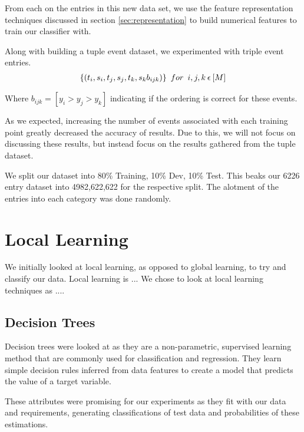 \documentclass[bsc,frontabs,twoside,singlespacing,parskip,deptreport]{infthesis}     %
\begin{document}
    From each on the entries in this new data set, we use the feature representation techniques discussed in section \ref{sec:representation} to build numerical
    features to train our classifier with.

Along with building a tuple event dataset, we experimented with triple event entries.
\begin{eqnarray}
      \{(t_{i},s_{i},t_{j},s_{j},t_{k},s_{k}b_{ijk})\} \hspace{0.5em} for \hspace{0.5em} i,j,k \hspace{0.2em}\epsilon \hspace{0.2em}[M]\nonumber
\end{eqnarray}

Where $b_{ijk} = [y_i > y_j > y_k]$ indicating if the ordering is correct for these events.


As we expected, increasing the number of events associated with each training point greatly decreased the accuracy of results.
Due to this, we will not focus on discussing these results, but instead focus on the results gathered from the tuple dataset.

We split our dataset into 80\% Training, 10\% Dev, 10\% Test. This beaks our 6226 entry dataset into 4982,622,622 for the respective split.
The alotment of the entries into each category was done randomly.

\section{Local Learning}
We initially looked at local learning, as opposed to global learning, to try and classify our data.
Local learning is ...
We chose to look at local learning techniques as .... 
\subsection{Decision Trees}
Decision trees were looked at as they are a non-parametric, supervised learning method
that are commonly used for classification and regression. They learn simple decision rules inferred from
data features to create a model that predicts the value of a target variable.

These attributes were promising for our experiments as they fit with our data and requirements, generating
classifications of test data and probabilities of these estimations.
\end{document}
